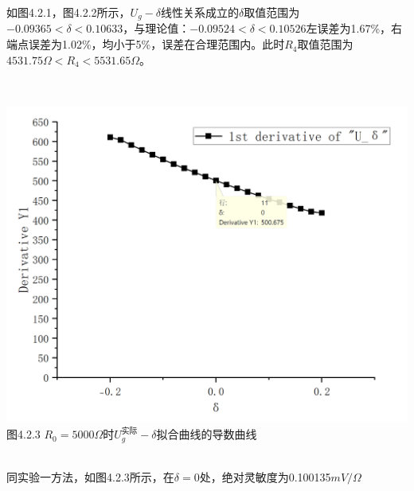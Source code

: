 \documentclass{ctexart}
\begin{document}
    如图4.2.1，图4.2.2所示，$U_g - \delta$线性关系成立的$\delta$取值范围为$-0.09365<\delta<0.10633$，与理论值：$-0.09524<\delta<0.10526$左误差为1.67\%，右端点误差为1.02\%，均小于5\%，误差在合理范围内。此时$R_4$取值范围为$4531.75\Omega<R_4<5531.65\Omega$。

    ~\\
    \begin{minipage}[c]{1\textwidth}
        \centering \includegraphics[scale=0.4]{2.1.3} \\\small{图4.2.3 $R_0=5000\Omega$时$U_g^{\text{实际}} - \delta$拟合曲线的导数曲线}
    \end{minipage}
    ~\\

    同实验一方法，如图4.2.3所示，在$\delta=0$处，绝对灵敏度为0.100135$mV/\Omega$
\end{document}
